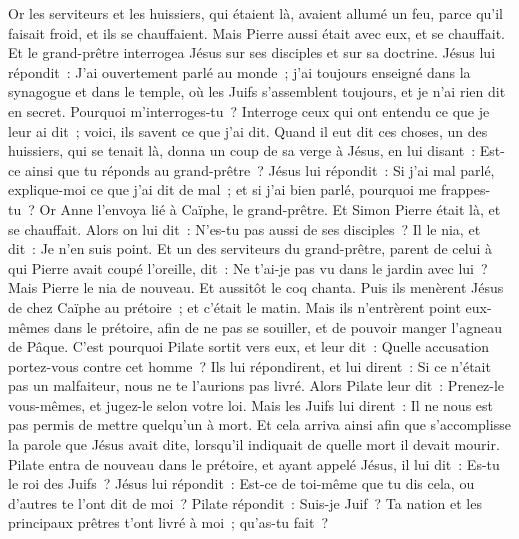 \begin{multicols}{2}
Or les serviteurs et les huissiers, qui étaient là, avaient allumé un feu, parce qu'il faisait froid, et ils se chauffaient. Mais Pierre aussi était avec eux, et se chauffait.
Et le grand-prêtre interrogea Jésus sur ses disciples et sur sa doctrine.
Jésus lui répondit~: J'ai ouvertement parlé au monde~; j'ai toujours enseigné dans la synagogue et dans le temple, où les Juifs s'assemblent toujours, et je n'ai rien dit en secret.
Pourquoi m'interroges-tu~? Interroge ceux qui ont entendu ce que je leur ai dit~; voici, ils savent ce que j'ai dit.
Quand il eut dit ces choses, un des huissiers, qui se tenait là, donna un coup de sa verge à Jésus, en lui disant~: Est-ce ainsi que tu réponds au grand-prêtre~?
Jésus lui répondit~: Si j'ai mal parlé, explique-moi ce que j'ai dit de mal~; et si j'ai bien parlé, pourquoi me frappes-tu~?
Or Anne l'envoya lié à Caïphe, le grand-prêtre.
Et Simon Pierre était là, et se chauffait. Alors on lui dit~: N'es-tu pas aussi de ses disciples~? Il le nia, et dit~: Je n'en suis point.
Et un des serviteurs du grand-prêtre, parent de celui à qui Pierre avait coupé l'oreille, dit~: Ne t'ai-je pas vu dans le jardin avec lui~?
Mais Pierre le nia de nouveau. Et aussitôt le coq chanta.
Puis ils menèrent Jésus de chez Caïphe au prétoire~; et c'était le matin. Mais ils n'entrèrent point eux-mêmes dans le prétoire, afin de ne pas se souiller, et de pouvoir manger l'agneau de Pâque.
C'est pourquoi Pilate sortit vers eux, et leur dit~: Quelle accusation portez-vous contre cet homme~?
Ils lui répondirent, et lui dirent~: Si ce n'était pas un malfaiteur, nous ne te l'aurions pas livré.
Alors Pilate leur dit~: Prenez-le vous-mêmes, et jugez-le selon votre loi. Mais les Juifs lui dirent~: Il ne nous est pas permis de mettre quelqu'un à mort.
Et cela arriva ainsi afin que s'accomplisse la parole que Jésus avait dite, lorsqu'il indiquait de quelle mort il devait mourir.
Pilate entra de nouveau dans le prétoire, et ayant appelé Jésus, il lui dit~: Es-tu le roi des Juifs~?
Jésus lui répondit~: Est-ce de toi-même que tu dis cela, ou d'autres te l'ont dit de moi~?
Pilate répondit~: Suis-je Juif~? Ta nation et les principaux prêtres t'ont livré à moi~; qu'as-tu fait~?

\end{multicols}
